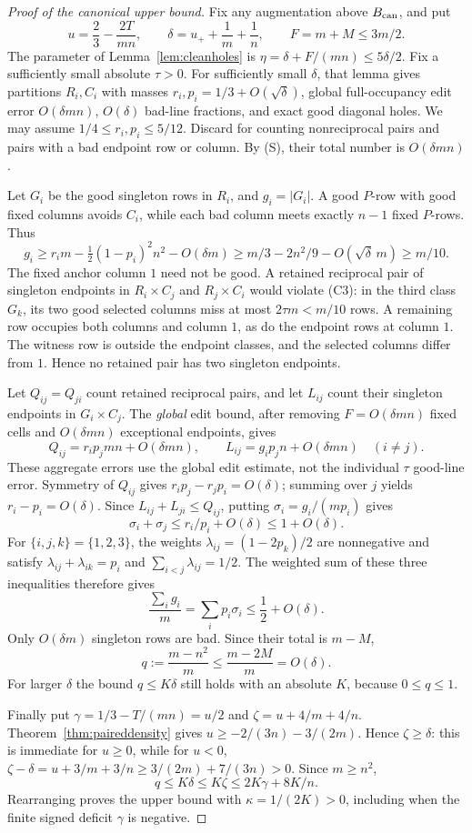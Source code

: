 \documentclass[11pt]{article}
\begin{document}
\begin{proof}[Proof of the canonical upper bound]
Fix any augmentation above $B_{\rm can}$, and put
\[
 u=\frac23-\frac{2T}{mn},\qquad
 \delta=u_++\frac1m+\frac1n,\qquad F=m+M\le3m/2.
\]
The parameter of Lemma~\ref{lem:cleanholes} is
$\eta=\delta+F/(mn)\le5\delta/2$. Fix a sufficiently small absolute
$\tau>0$. For sufficiently small $\delta$, that lemma gives partitions
$R_i,C_i$ with masses $r_i,p_i=1/3+O(\sqrt\delta)$, global full-occupancy
edit error $O(\delta mn)$, $O(\delta)$ bad-line fractions, and exact
good diagonal holes. We may assume $1/4\le r_i,p_i\le5/12$.
Discard for counting nonreciprocal pairs and pairs with a bad endpoint
row or column. By (S), their total number is $O(\delta mn)$.

Let $G_i$ be the good singleton rows in $R_i$, and $g_i=|G_i|$.
A good $P$-row with good fixed columns avoids $C_i$, while each bad
column meets exactly $n-1$ fixed $P$-rows. Thus
\[
 g_i\ge r_im-\tfrac12(1-p_i)^2n^2-O(\delta m)
      \ge m/3-2n^2/9-O(\sqrt\delta\,m)\ge m/10.
\]
The fixed anchor column $1$ need not be good. A retained reciprocal
pair of singleton endpoints in $R_i\times C_j$ and $R_j\times C_i$
would violate (C3): in the third class $G_k$, its two good selected
columns miss at most $2\tau m<m/10$ rows. A remaining row occupies
both columns and column $1$, as do the endpoint rows at column $1$.
The witness row is outside the endpoint classes, and the selected
columns differ from $1$. Hence no retained pair has two singleton endpoints.

Let $Q_{ij}=Q_{ji}$ count retained reciprocal pairs, and let $L_{ij}$
count their singleton endpoints in $G_i\times C_j$. The \emph{global}
edit bound, after removing $F=O(\delta mn)$ fixed cells and
$O(\delta mn)$ exceptional endpoints, gives
\[
 Q_{ij}=r_ip_jmn+O(\delta mn),\qquad
 L_{ij}=g_ip_jn+O(\delta mn)\quad(i\ne j).
\]
These aggregate errors use the global edit estimate, not the individual
$\tau$ good-line error. Symmetry of $Q_{ij}$ gives
$r_ip_j-r_jp_i=O(\delta)$; summing over $j$ yields
$r_i-p_i=O(\delta)$. Since $L_{ij}+L_{ji}\le Q_{ij}$, putting
$\sigma_i=g_i/(mp_i)$ gives
\[
 \sigma_i+\sigma_j\le r_i/p_i+O(\delta)\le1+O(\delta).
\]
For $\{i,j,k\}=\{1,2,3\}$, the weights
$\lambda_{ij}=(1-2p_k)/2$ are nonnegative and satisfy
$\lambda_{ij}+\lambda_{ik}=p_i$ and $\sum_{i<j}\lambda_{ij}=1/2$.
The weighted sum of these three inequalities therefore gives
\[
 \frac{\sum_i g_i}{m}=\sum_i p_i\sigma_i\le\frac12+O(\delta).
\]
Only $O(\delta m)$ singleton rows are bad. Since their total is $m-M$,
\[
 q:=\frac{m-n^2}{m}\le\frac{m-2M}{m}=O(\delta).
\]
For larger $\delta$ the bound $q\le K\delta$ still holds with an
absolute $K$, because $0\le q\le1$.

Finally put $\gamma=1/3-T/(mn)=u/2$ and $\zeta=u+4/m+4/n$.
Theorem~\ref{thm:paireddensity} gives
$u\ge-2/(3n)-3/(2m)$. Hence $\zeta\ge\delta$: this is immediate
for $u\ge0$, while for $u<0$,
$\zeta-\delta=u+3/m+3/n\ge3/(2m)+7/(3n)>0$.
Since $m\ge n^2$,
\[
 q\le K\delta\le K\zeta\le2K\gamma+8K/n.
\]
Rearranging proves the upper bound with $\kappa=1/(2K)>0$, including
when the finite signed deficit $\gamma$ is negative.
\end{proof}
\end{document}

